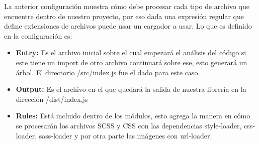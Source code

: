 \newline
La anterior configuración muestra cómo debe procesar cada tipo de archivo que encuentre dentro de nuestro proyecto, por eso dada una expresión regular que define extensiones de archivos puede usar un cargador a usar.
Lo que es definido en la configuración es:
\begin{itemize}
\item \textbf{Entry: } Es el archivo inicial sobre el cual empezará el análisis del código si este tiene un import de otro archivo continuará sobre ese, esto generará un árbol. El directorio /src/index.js fue el dado para este caso.
\item \textbf{Output: } Es el archivo en el que quedará la salida de nuestra librería en la dirección /dist/index.js
\item \textbf{Rules: }Está incluido dentro de los módulos, esto agrega la manera en cómo se procesarán los archivos SCSS y CSS  con las dependencias style-loader, css-loader, sass-loader y por otra parte las imágenes con url-loader.
\end{itemize}


